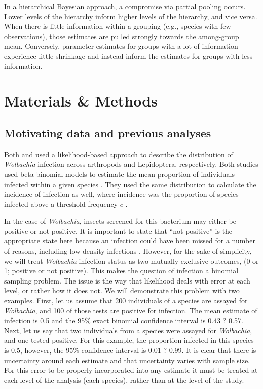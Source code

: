 \documentclass{frontiersSCNS}
\begin{document}
In a hierarchical Bayesian approach, a compromise via partial pooling occurs. Lower levels of the hierarchy inform higher levels of the hierarchy, and vice versa. When there is little information within a grouping (e.g., species with few observations), those estimates are pulled strongly towards the among-group mean. Conversely, parameter estimates for groups with a lot of information experience little shrinkage and instead inform the estimates for groups with less information.


\section{Materials \& Methods}
\subsection{Motivating data and previous analyses}


Both \cite{Weinert:2015aa} and \cite{Ahmed:2015aa} used a likelihood-based approach to describe the distribution of \emph{Wolbachia} infection across arthropods and Lepidoptera, respectively. Both studies used beta-binomial models to estimate the mean proportion of individuals infected within a given species \citep{Hilgenboecker:2008aa}. They used the same distribution to calculate the incidence of infection as well, where incidence was the proportion of species infected above a threshold frequency $c$  \citep[i.e.,, one infection in 1000 individuals, or 0.001;][]{Weinert:2015aa}. 

In the case of \textit{Wolbachia}, insects screened for this bacterium may either be positive or not positive. It is important to state that ``not positive'' is the appropriate state here because an infection could have been missed for a number of reasons, including low density infections \citep{Schneider:2014jv}. However, for the sake of simplicity, we will treat \textit{Wolbachia} infection status as two mutually exclusive outcomes, (0 or 1; positive or not positive). This makes the question of infection a binomial sampling problem. The issue is the way that likelihood deals with error at each level, or rather how it does not. We will demonstrate this problem with two examples. First, let us assume that 200 individuals of a species are assayed for \textit{Wolbachia}, and 100 of those tests are positive for infection. The mean estimate of infection is 0.5 and the 95\% exact binomial confidence interval is 0.43 ? 0.57. Next, let us say that two individuals from a species were assayed for \textit{Wolbachia}, and one tested positive. For this example, the proportion infected in this species is 0.5, however, the 95\% confidence interval is 0.01 ? 0.99. It is clear that there is uncertainty around each estimate and that uncertainty varies with sample size. For this error to be properly incorporated into any estimate it must be treated at each level of the analysis (each species), rather than at the level of the study. 
\end{document}
